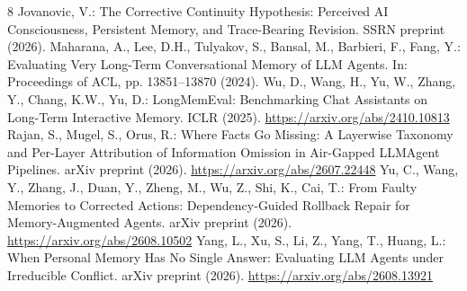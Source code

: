 \documentclass[runningheads]{llncs}
\begin{document}
\begin{thebibliography}{8}
 Jovanovic, V.: The Corrective Continuity Hypothesis: Perceived AI Consciousness, Persistent Memory, and Trace-Bearing Revision. SSRN preprint (2026). 
 Maharana, A., Lee, D.H., Tulyakov, S., Bansal, M., Barbieri, F., Fang, Y.: Evaluating Very Long-Term Conversational Memory of LLM Agents. In: Proceedings of ACL, pp. 13851--13870 (2024). 
 Wu, D., Wang, H., Yu, W., Zhang, Y., Chang, K.W., Yu, D.: LongMemEval: Benchmarking Chat Assistants on Long-Term Interactive Memory. ICLR (2025). \url{https://arxiv.org/abs/2410.10813}
 Rajan, S., Mugel, S., Orus, R.: Where Facts Go Missing: A Layerwise Taxonomy and Per-Layer Attribution of Information Omission in Air-Gapped LLMAgent Pipelines. arXiv preprint (2026). \url{https://arxiv.org/abs/2607.22448}
 Yu, C., Wang, Y., Zhang, J., Duan, Y., Zheng, M., Wu, Z., Shi, K., Cai, T.: From Faulty Memories to Corrected Actions: Dependency-Guided Rollback Repair for Memory-Augmented Agents. arXiv preprint (2026). \url{https://arxiv.org/abs/2608.10502}
 Yang, L., Xu, S., Li, Z., Yang, T., Huang, L.: When Personal Memory Has No Single Answer: Evaluating LLM Agents under Irreducible Conflict. arXiv preprint (2026). \url{https://arxiv.org/abs/2608.13921}
\end{thebibliography}
\end{document}
